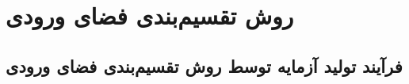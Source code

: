 \section{روش تقسیم‌بندی فضای ورودی}

\subsection{فرآیند تولید آزمایه توسط روش تقسیم‌بندی فضای ورودی}





%
%
%
%
